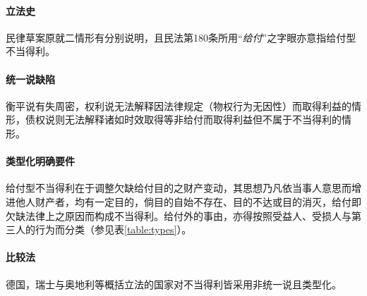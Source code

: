 \documentclass[UTF-8]{ctexrep}
\newcommand{\article}[1]{民法第#1条}
\newcommand{\quot}[1]{“\emph{#1}”}
\begin{document}
  \paragraph{立法史}民律草案原就二情形有分别说明，且\article{180}所用\quot{给付}之字眼亦意指给付型不当得利。
  \paragraph{统一说缺陷}衡平说有失周密，权利说无法解释因法律规定（物权行为无因性）而取得利益的情形，债权说则无法解释诸如时效取得等非给付而取得利益但不属于不当得利的情形。
  \paragraph{类型化明确要件}给付型不当得利在于调整欠缺给付目的之财产变动，其思想乃凡依当事人意思而增进他人财产者，均有一定目的，倘目的自始不存在、目的不达或目的消灭，给付即欠缺法律上之原因而构成不当得利。给付外的事由，亦得按照受益人、受损人与第三人的行为而分类（参见表\ref{table:types}）。
  \paragraph{比较法}德国，瑞士与奥地利等概括立法的国家对不当得利皆采用非统一说且类型化。
\end{document}
